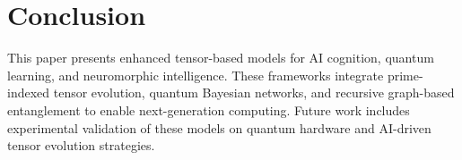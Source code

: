 \documentclass{article}
\theoremstyle{plain}
\begin{document}
\section{Conclusion}
This paper presents enhanced tensor-based models for AI cognition, quantum learning, and neuromorphic intelligence. These frameworks integrate prime-indexed tensor evolution, quantum Bayesian networks, and recursive graph-based entanglement to enable next-generation computing. Future work includes experimental validation of these models on quantum hardware and AI-driven tensor evolution strategies.
\end{document}
